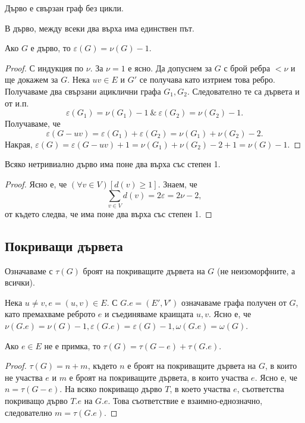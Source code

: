 \begin{dfn}
  Дърво е свързан граф без цикли.
\end{dfn}

\begin{thm}
  В дърво, между всеки два върха има единствен път.
\end{thm}

\begin{thm}
  Ако $G$ е дърво, то $\varepsilon(G) = \nu(G) - 1$.
\end{thm}
\begin{proof}
  С индукция по $\nu$. За $\nu = 1$ е ясно.
  Да допуснем за $G$ с брой ребра $<\nu$ и ще докажем за $G$.
  Нека $uv\in E$ и $G'$ се получава като изтрием това ребро.
  Получаваме два свързани ациклични графа $G_1, G_2$.
  Следователно те са дървета и от и.п. 
  \[\varepsilon(G_1) = \nu(G_1) - 1\ \&\ \varepsilon(G_2) = \nu(G_2) - 1.\]
  Получаваме, че 
  \[\varepsilon(G - uv) = \varepsilon(G_1) + \varepsilon(G_2) = \nu(G_1) + \nu(G_2) - 2.\]
  Накрая, $\varepsilon(G) = \varepsilon(G-uv) + 1 = \nu(G_1) + \nu(G_2) - 2 + 1= \nu(G) - 1$.
\end{proof}

\begin{crl}
  Всяко нетривиално дърво има поне два върха със степен 1.
\end{crl}
\begin{proof}
  Ясно е, че $(\forall v\in V)[d(v) \geq 1]$.
  Знаем, че \[\sum_{v\in V}d(v) = 2\varepsilon = 2\nu - 2,\] от където следва, че има поне два върха със степен 1.
\end{proof}



\subsection{Покриващи дървета}

Означаваме с $\tau(G)$ броят на покриващите дървета на $G$ (не неизоморфните, а всички).

Нека $u\neq v, e = (u,v)\in E$. С $G.e = (E',V')$ означаваме графа получен от $G$, като премахваме реброто $e$ и 
съединяваме краищата $u,v$. Ясно е, че $\nu(G.e) = \nu(G) - 1, \varepsilon(G.e) = \varepsilon(G) - 1, \omega(G.e) = \omega(G)$.

\begin{thm}
  Ако $e\in E$ не е примка, то
  $\tau(G) = \tau(G-e) + \tau(G.e)$.
\end{thm}
\begin{proof}
  $\tau(G) = n + m$, където $n$ е броят на покриващите дървета на $G$, в които не участва $e$
  и $m$ е броят на покриващите дървета, в които участва $e$.
  Ясно е, че $n = \tau(G-e)$.
  На всяко покриващо дърво $T$, в което участва $e$, съответства покриващо дърво $T.e$ на $G.e$.
  Това съответствие е взаимно-еднозначно, следователно $m = \tau(G.e)$.
\end{proof}

